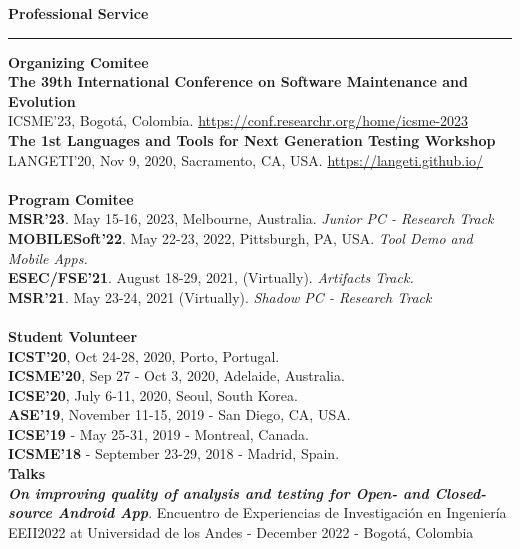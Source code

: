 \documentclass[letterpaper,11pt,oneside]{article}
\begin{document}
\noindent \LARGE{\textbf{Professional Service}} \\
\vspace{-2ex}
\hrule 
\normalsize
\vspace{2ex}
\noindent \large{\textbf{Organizing Comitee}}\\
\indent\textbf{The 39th International Conference on Software Maintenance and Evolution}\\
\indent ICSME'23, Bogotá, Colombia. \href{https://conf.researchr.org/home/icsme-2023}{https://conf.researchr.org/home/icsme-2023} \\
\indent\textbf{The 1st Languages and Tools for Next Generation Testing Workshop} \\
\indent LANGETI'20, Nov 9, 2020, Sacramento, CA, USA. \href{https://langeti.github.io/}{https://langeti.github.io/} \\
\\
\noindent \large{\textbf{Program Comitee}} \\
\indent \textbf{MSR'23}. May 15-16, 2023, Melbourne, Australia. \textit{Junior PC - Research Track} \\
\indent \textbf{MOBILESoft'22}. May 22-23, 2022, Pittsburgh, PA, USA. \textit{Tool Demo and Mobile Apps.} \\
\indent \textbf{ESEC/FSE'21}. August 18-29, 2021, (Virtually). \textit{Artifacts Track.} \\
\indent \textbf{MSR'21}. May 23-24, 2021 (Virtually). \textit{Shadow PC - Research Track} \\
\\
\noindent \large{\textbf{Student Volunteer}} \\
\indent \textbf{ICST'20}, Oct 24-28, 2020, Porto, Portugal. \\
\indent \textbf{ICSME'20}, Sep 27 - Oct 3, 2020, Adelaide, Australia. \\
\indent \textbf{ICSE'20}, July 6-11, 2020, Seoul, South Korea. \\
\indent \textbf{ASE'19}, November 11-15, 2019 - San Diego, CA, USA. \\
\indent \textbf{ICSE'19} - May 25-31, 2019 - Montreal, Canada. \\
\indent \textbf{ICSME'18} - September 23-29, 2018 - Madrid, Spain. \\
\noindent \large{\textbf{Talks}} \\
\indent \textit{\textbf{On improving quality of analysis and testing for Open- and Closed-source Android App}}. Encuentro de Experiencias de Investigaci\'on en Ingeniería EEII2022 at Universidad de los Andes - December 2022 - Bogot\'a, Colombia
\end{document}
